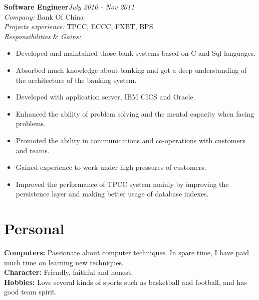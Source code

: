 \documentclass[line, margin, 11pt]{res}
\begin{document}
\begin{resume}
{\bf Software Engineer}\hfill {\it July 2010 - Nov 2011}\\
{\sl Company:} Bank Of China\\
{\sl Projects experience:} TPCC, ECCC, FXBT, BPS\\
{\sl Responsibilities} \& {\sl Gains:}
\begin{itemize}
\item Developed and maintained those bank systems based on C and Sql languages.
\item Absorbed much knowledge about banking and got a deep understanding of the architecture of the banking system.
\item Developed with application server, IBM CICS and Oracle.
\item Enhanced the ability of problem solving and the mental capacity when facing problems.
\item Promoted the ability in communications and co-operations with customers and teams.
\item Gained experience to work under high pressures of customers.
\item Improved the performance of TPCC system mainly by improving the persistence layer and making better usage of database indexes.
\end{itemize}

\section{Personal}
{\bf Computers:} Passionate about computer techniques. In spare time, I have paid much time on learning new techniques.\\
{\bf Character:} Friendly, faithful and honest.\\
{\bf Hobbies:} Love several kinds of sports such as basketball and football, and has good team spirit.\\
\end{resume}
\end{document}
